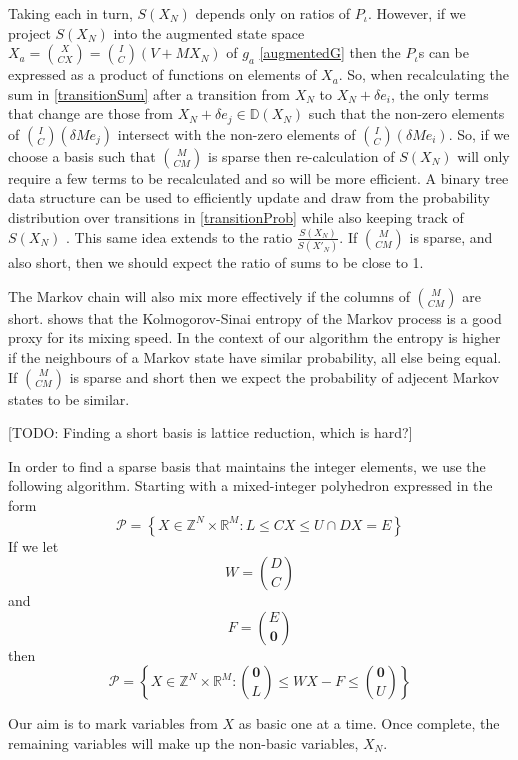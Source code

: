 \documentclass{article}
\begin{document}
Taking each in turn, $S(X_N)$ depends only on ratios of $P_\iota$. However, if we project $S(X_N)$ into the augmented state space $X_a = {X \choose CX} = {I \choose C}(V + MX_N)$ of $g_a$ \eqref{augmentedG} then the $P_\iota$s can be expressed as a product of functions on elements of $X_a$. So, when recalculating the sum in \eqref{transitionSum} after a transition from $X_N$ to $X_N + \delta e_i$, the only terms that change are those from $X_N + \delta e_j \in \mathbb{D}(X_N)$ such that the non-zero elements of ${I \choose C}(\delta Me_j)$ intersect with the non-zero elements of ${I \choose C}(\delta Me_i)$. So, if we choose a basis such that ${M \choose CM}$ is sparse then re-calculation of $S(X_N)$ will only require a few terms to be recalculated and so will be more efficient. A binary tree data structure can be used to efficiently update and draw from the probability distribution over transitions in \eqref{transitionProb} while also keeping track of $S(X_N)$ \citep{TangMutableCategorical}. This same idea extends to the ratio $\frac{S(X_N)}{S(X'_N)}$. If ${M \choose CM}$ is sparse, and also short, then we should expect the ratio of sums to be close to 1.

The Markov chain will also mix more effectively if the columns of ${M \choose CM}$ are short. \citet{mihelich2018maximum} shows that the Kolmogorov-Sinai entropy of the Markov process is a good proxy for its mixing speed. In the context of our algorithm the entropy is higher if the neighbours of a Markov state have similar probability, all else being equal. If ${M \choose CM}$ is sparse and short then we expect the probability of adjecent Markov states to be similar.

[TODO: Finding a short basis is lattice reduction, which is hard?]

In order to find a sparse basis that maintains the integer elements, we use the following algorithm. Starting with a mixed-integer polyhedron expressed in the form
\[
\mathcal{P} = \left\{X \in \mathbb{Z}^N \times \mathbb{R}^M: L \le CX \le U \cap DX = E \right\}
\]
If we let
\[
W= {D \choose C}
\]
and
\[
F = {E \choose \mathbf{0}}
\]
then
\begin{equation}
\mathcal{P} = \left\{X \in \mathbb{Z}^N \times \mathbb{R}^M: {\mathbf{0} \choose L} \le W X - F \le {\mathbf{0} \choose U} \right\}
\label{jointconstraints}
\end{equation}

Our aim is to mark variables from $X$ as basic one at a time. Once complete, the remaining variables will make up the non-basic variables, $X_N$.
\end{document}
